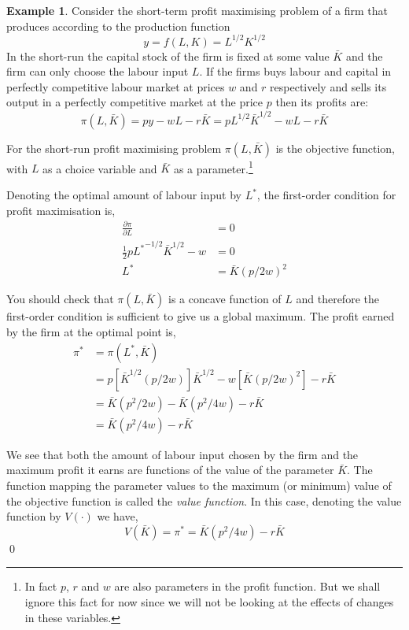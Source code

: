 \documentclass[11pt,reqno,openany]{amsbook}
\theoremstyle{plain}
\theoremstyle{definition}
\newtheorem{exmp}{Example}[chapter]
\begin{document}
\begin{exmp}\label{exmp:opti:profit}
Consider the short-term profit
maximising problem of a firm that produces according
to the production function
\[y=f(L,K)=L^{1/2}K^{1/2}\]
In the short-run the capital stock of the firm is fixed at some value
$\bar K$ and the firm can only choose the labour input $L$. If the
firms buys labour and capital in perfectly competitive labour market at prices
$w$ and $r$ respectively and sells its output in a perfectly competitive market at the
price $p$ then its profits are:
\[\pi(L,\bar K)=py-wL-r\bar K=pL^{1/2}{\bar K}^{1/2}-wL-r\bar K\]

For the short-run profit maximising problem $\pi(L,\bar K)$ is the
objective function, with $L$ as a choice variable and $\bar K$ as a
parameter.\footnote{In fact $p$, $r$ and $w$ are also parameters in
  the profit function. But we shall ignore this fact for now since we
  will not be looking at the effects of changes in these variables.}

Denoting the optimal amount of labour input by $L^*$, the first-order condition for profit maximisation is,
\begin{align*}
\frac{\partial \pi}{\partial L}&=0\\
\frac{1}{2}p{L^*}^{-1/2}{\bar K}^{1/2}-w&=0\\
L^*&={\bar K}(p/2w)^2
\end{align*}

You should check that $\pi(L,\bar K)$ is a concave function of $L$ and
therefore the first-order condition is sufficient to give us a global
maximum. The profit earned by the firm at the optimal point is,
\begin{align*}
\pi^*&=\pi(L^*,\bar K)\\
&=p[{\bar K}^{1/2}(p/2w)]{\bar K}^{1/2}-w[{\bar K}(p/2w)^2]-r\bar K\\
&={\bar K}(p^2/2w)-{\bar K}(p^2/4w)-r\bar K\\
&={\bar K}(p^2/4w)-r\bar K
\end{align*}

We see that both the amount of labour input chosen by the firm and the
maximum profit it earns are functions of the value of the parameter
$\bar K$. The function mapping the parameter values to the maximum (or
minimum) value of the objective function is called the \emph{value
  function}. In this case, denoting the value function by $V(\cdot)$
we have,
\[V(\bar K)=\pi^*={\bar K}(p^2/4w)-r\bar K\]
\qed
\end{exmp}
\end{document}
